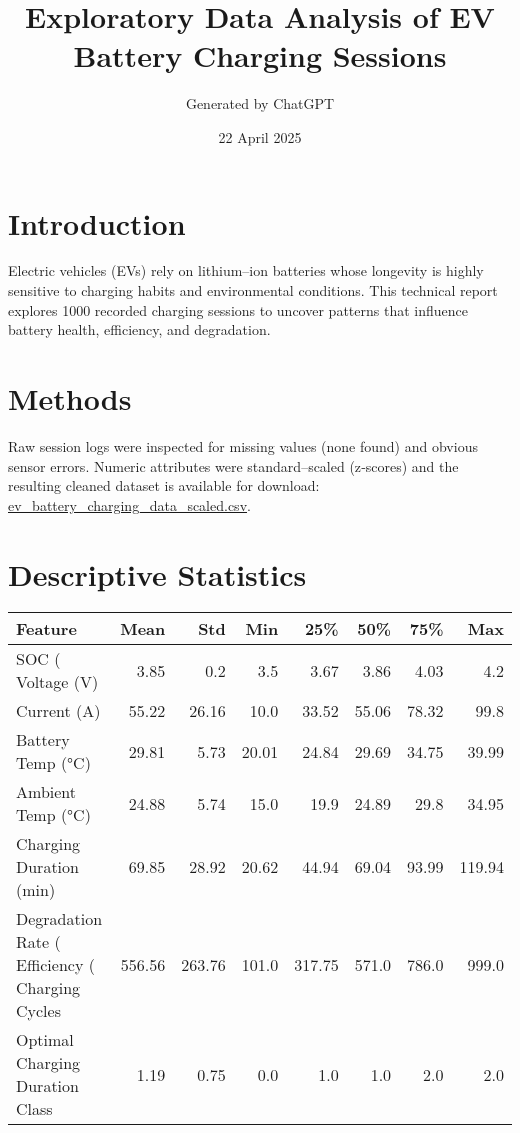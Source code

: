 \documentclass[11pt,a4paper]{article}
\title{Exploratory Data Analysis of EV Battery Charging Sessions}
\author{Generated by ChatGPT}
\date{22 April 2025}
\begin{document}
\maketitle

\section{Introduction}
Electric vehicles (EVs) rely on lithium–ion batteries whose longevity is highly sensitive to charging habits and environmental conditions.  
This technical report explores 1000 recorded charging sessions to uncover patterns that influence battery health, efficiency, and degradation.

\section{Methods}
Raw session logs were inspected for missing values (none found) and obvious sensor errors.  
Numeric attributes were standard–scaled (z‑scores) and the resulting cleaned dataset is available for download:  
\href{run:ev_battery_charging_data_scaled.csv}{ev\_battery\_charging\_data\_scaled.csv}.

\section{Descriptive Statistics}
\begin{center}
\begin{tabular}{lrrrrrrr}
\toprule
Feature & Mean & Std & Min & 25\% & 50\% & 75\% & Max \\
\midrule
SOC (%
Voltage (V) & 3.85 & 0.2 & 3.5 & 3.67 & 3.86 & 4.03 & 4.2 \\
Current (A) & 55.22 & 26.16 & 10.0 & 33.52 & 55.06 & 78.32 & 99.8 \\
Battery Temp (°C) & 29.81 & 5.73 & 20.01 & 24.84 & 29.69 & 34.75 & 39.99 \\
Ambient Temp (°C) & 24.88 & 5.74 & 15.0 & 19.9 & 24.89 & 29.8 & 34.95 \\
Charging Duration (min) & 69.85 & 28.92 & 20.62 & 44.94 & 69.04 & 93.99 & 119.94 \\
Degradation Rate (%
Efficiency (%
Charging Cycles & 556.56 & 263.76 & 101.0 & 317.75 & 571.0 & 786.0 & 999.0 \\
Optimal Charging Duration Class & 1.19 & 0.75 & 0.0 & 1.0 & 1.0 & 2.0 & 2.0 \\
\bottomrule
\end{tabular}
\end{center}
\end{document}
